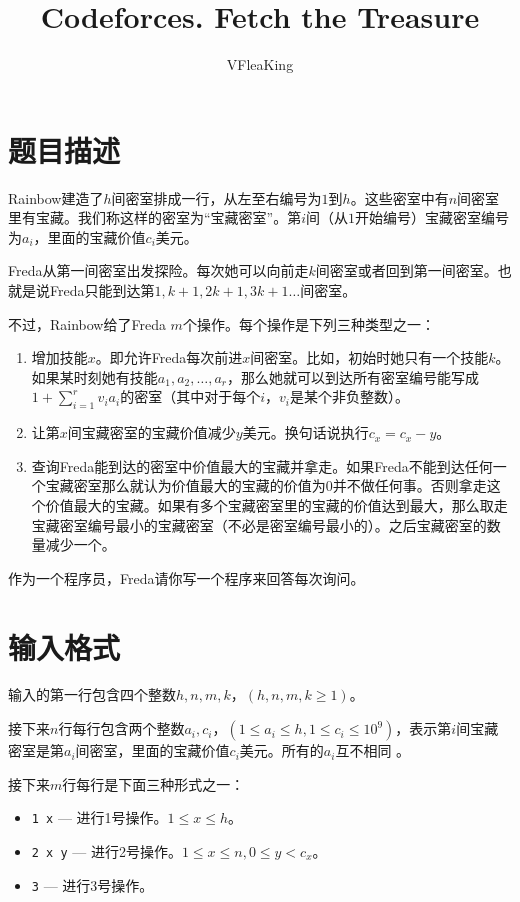 \documentclass[11pt, a4paper]{article}
\title{Codeforces. Fetch the Treasure}
\author{VFleaKing}
\begin{document}
\maketitle

\section*{题目描述}
Rainbow建造了$h$间密室排成一行，从左至右编号为$1$到$h$。这些密室中有$n$间密室里有宝藏。我们称这样的密室为``宝藏密室''。第$i$间（从$1$开始编号）宝藏密室编号为$a_i$，里面的宝藏价值$c_i$美元。

Freda从第一间密室出发探险。每次她可以向前走$k$间密室或者回到第一间密室。也就是说Freda只能到达第$1, k+1, 2k+1, 3k+1 \dots$间密室。

不过，Rainbow给了Freda $m$个操作。每个操作是下列三种类型之一：
\begin{enumerate}
  \item 增加技能$x$。即允许Freda每次前进$x$间密室。比如，初始时她只有一个技能$k$。如果某时刻她有技能$a_1, a_2, \dots, a_r$，那么她就可以到达所有密室编号能写成$1+\sum_{i=1}^{r}{v_i a_i}$的密室（其中对于每个$i$，$v_i$是某个非负整数）。
  \item 让第$x$间宝藏密室的宝藏价值减少$y$美元。换句话说执行$c_x = c_x - y$。
  \item 查询Freda能到达的密室中价值最大的宝藏并拿走。如果Freda不能到达任何一个宝藏密室那么就认为价值最大的宝藏的价值为$0$并不做任何事。否则拿走这个价值最大的宝藏。如果有多个宝藏密室里的宝藏的价值达到最大，那么取走宝藏密室编号最小的宝藏密室（不必是密室编号最小的）。之后宝藏密室的数量减少一个。
\end{enumerate}

作为一个程序员，Freda请你写一个程序来回答每次询问。

\section*{输入格式}
输入的第一行包含四个整数$h, n, m, k$，$(h, n, m, k \geq 1)$。

接下来$n$行每行包含两个整数$a_i, c_i$，$(1 \leq a_i \leq h, 1 \leq c_i \leq 10^9)$，表示第$i$间宝藏密室是第$a_i$间密室，里面的宝藏价值$c_i$美元。所有的$a_i$互不相同
。

接下来$m$行每行是下面三种形式之一：
\begin{itemize}
  \item \texttt{1 x} --- 进行1号操作。$1 \leq x \leq h$。
  \item \texttt{2 x y} --- 进行2号操作。$1 \leq x \leq n, 0 \leq y < c_x$。
  \item \texttt{3} --- 进行3号操作。
\end{itemize}
\end{document}
